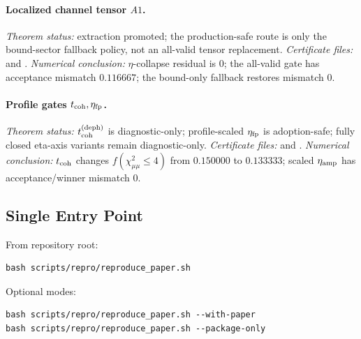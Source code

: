 \documentclass[aps,prd,onecolumn,notitlepage,nofootinbib,superscriptaddress,11pt,floatfix]{revtex4-2}
\begin{document}
\paragraph{Localized channel tensor \(A1\).}
\emph{Theorem status:} extraction promoted; the production-safe route is only the bound-sector fallback policy, not an all-valid tensor replacement.
\emph{Certificate files:}  and .
\emph{Numerical conclusion:} \(\eta\)-collapse residual is \(0\); the all-valid gate has acceptance mismatch \(0.116667\); the bound-only fallback restores mismatch \(0\).

\paragraph{Profile gates \(t_{\rm coh},\eta_{\rm fp}\).}
\emph{Theorem status:} \(t_{\rm coh}^{(\rm deph)}\) is diagnostic-only; profile-scaled \(\eta_{\rm fp}\) is adoption-safe; fully closed eta-axis variants remain diagnostic-only.
\emph{Certificate files:}  and .
\emph{Numerical conclusion:} \(t_{\rm coh}\) changes \(f(\chi^2_{\mu\mu}\le4)\) from \(0.150000\) to \(0.133333\); scaled \(\eta_{\rm amp}\) has acceptance/winner mismatch \(0\).

\subsection{Single Entry Point}
From repository root:
\begin{verbatim}
bash scripts/repro/reproduce_paper.sh
\end{verbatim}
Optional modes:
\begin{verbatim}
bash scripts/repro/reproduce_paper.sh --with-paper
bash scripts/repro/reproduce_paper.sh --package-only
\end{verbatim}
\end{document}
